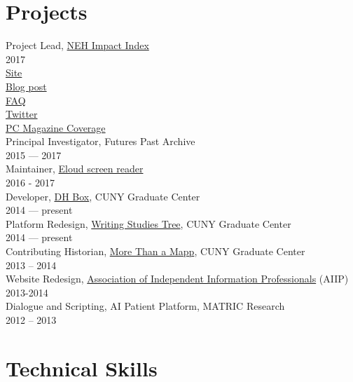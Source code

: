 \documentclass[11pt]{article}
\begin{document}
\section*{Projects}
\label{sec:orgheadline10}
Project Lead, \href{http://www.nehimpact.org/}{NEH Impact Index}\\
2017\\
\href{http://www.nehimpact.org/}{Site}\\
\href{https://digitalfellows.commons.gc.cuny.edu/2017/04/10/exploring-the-local-impact-of-the-neh-neh-impact-index/}{Blog post}\\
\href{http://www.nehimpact.org/faq}{FAQ}\\
\href{https://twitter.com/psmyth01/status/851505002900336644}{Twitter}\\
\href{http://www.pcmag.com/commentary/353904/trump-budget-slashes-neh-funding-why-you-should-care}{PC Magazine Coverage}\\

Principal Investigator, Futures Past Archive\\
2015 — 2017\\

Maintainer, \href{https://github.com/smythp/eloud}{Eloud screen reader}\\
2016 - 2017\\

Developer, \href{http://dhbox.org/}{DH Box}, CUNY Graduate Center\\
2014 — present\\

Platform Redesign, \href{http://www.writingstudiestree.org/}{Writing Studies Tree}, CUNY Graduate Center\\
2014 — present\\

Contributing Historian, \href{http://www.morethanamapp.org/}{More Than a Mapp}, CUNY Graduate Center\\
2013 – 2014\\

Website Redesign, \href{http://www.aiip.org/}{Association of Independent Information Professionals} (AIIP)\\
2013-2014\\

Dialogue and Scripting, AI Patient Platform, MATRIC Research\\
2012 – 2013\\

\section*{Technical Skills}
\label{sec:orgheadline11}
\end{document}
